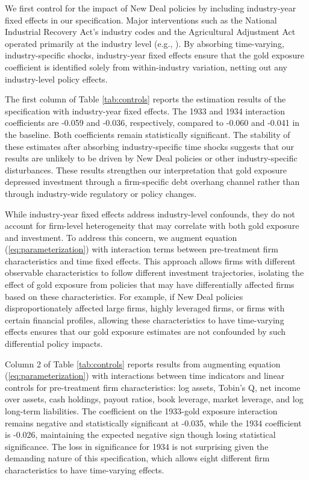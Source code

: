 We first control for the impact of New Deal policies by including industry-year fixed effects in our specification. Major interventions such as the National Industrial Recovery Act's industry codes and the Agricultural Adjustment Act operated primarily at the industry level (e.g., \cite{Cole2004}). By absorbing time-varying, industry-specific shocks, industry-year fixed effects ensure that the gold exposure coefficient is identified solely from within-industry variation, netting out any industry-level policy effects. 

The first column of Table \ref{tab:controls} reports the estimation results of the specification with industry-year fixed effects. The 1933 and 1934 interaction coefficients are -0.059 and -0.036, respectively, compared to -0.060 and -0.041 in the baseline. Both coefficients remain statistically significant. The stability of these estimates after absorbing industry-specific time shocks suggests that our results are unlikely to be driven by New Deal policies or other industry-specific disturbances. These results strengthen our interpretation that gold exposure depressed investment through a firm-specific debt overhang channel rather than through industry-wide regulatory or policy changes.

While industry-year fixed effects address industry-level confounds, they do not account for firm-level heterogeneity that may correlate with both gold exposure and investment. To address this concern, we augment equation (\ref{eq:parameterization}) with interaction terms between pre-treatment firm characteristics and time fixed effects. This approach allows firms with different observable characteristics to follow different investment trajectories, isolating the effect of gold exposure from policies that may have differentially affected firms based on these characteristics. For example, if New Deal policies disproportionately affected large firms, highly leveraged firms, or firms with certain financial profiles, allowing these characteristics to have time-varying effects ensures that our gold exposure estimates are not confounded by such differential policy impacts.

Column 2 of Table \ref{tab:controls} reports results from augmenting equation (\ref{eq:parameterization}) with interactions between time indicators and linear controls for pre-treatment firm characteristics: log assets, Tobin's Q, net income over assets, cash holdings, payout ratios, book leverage, market leverage, and log long-term liabilities. The coefficient on the 1933-gold exposure interaction remains negative and statistically significant at -0.035, while the 1934 coefficient is -0.026, maintaining the expected negative sign though losing statistical significance. The loss in significance for 1934 is not surprising given the demanding nature of this specification, which allows eight different firm characteristics to have time-varying effects.

